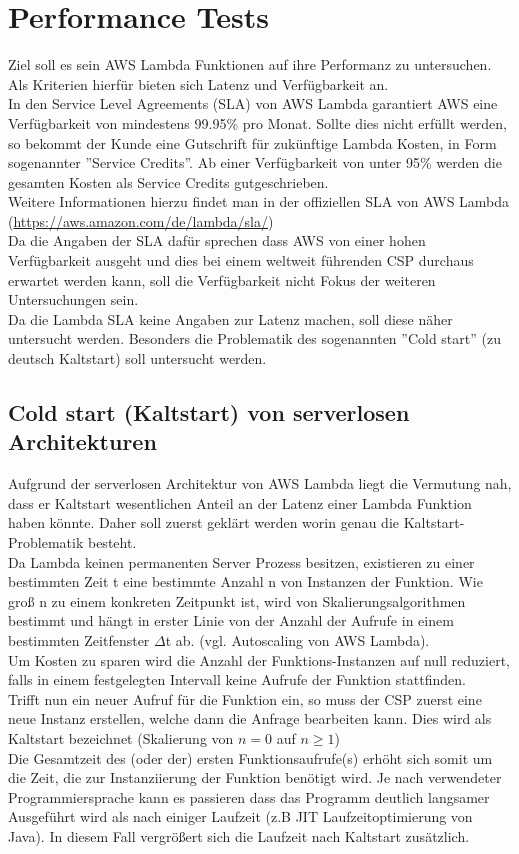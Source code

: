 \documentclass[12pt,a4paper,parskip=half]{scrreprt}
\begin{document}
\chapter{Performance Tests}

Ziel soll es sein AWS Lambda Funktionen auf ihre Performanz zu untersuchen. Als Kriterien hierfür bieten sich Latenz und Verfügbarkeit an.
\\
In den Service Level Agreements (SLA) von AWS Lambda garantiert AWS eine Verfügbarkeit von mindestens 99.95\% pro Monat. Sollte dies nicht erfüllt werden, so bekommt der Kunde eine Gutschrift für zukünftige Lambda Kosten, in Form sogenannter ''Service Credits''. Ab einer Verfügbarkeit von unter 95\% werden die gesamten Kosten als Service Credits gutgeschrieben.
\cite{Lambda-SLA}
\\
Weitere Informationen hierzu findet man in der offiziellen SLA von AWS Lambda (\url{https://aws.amazon.com/de/lambda/sla/})
\\
Da die Angaben der SLA dafür sprechen dass AWS von einer hohen Verfügbarkeit ausgeht und dies bei einem weltweit führenden CSP durchaus erwartet werden kann, soll die Verfügbarkeit nicht Fokus der weiteren Untersuchungen sein.
\\
Da die Lambda SLA keine Angaben zur Latenz machen, soll diese näher untersucht werden. Besonders die Problematik des sogenannten ''Cold start'' (zu deutsch Kaltstart) soll untersucht werden.

\section{Cold start (Kaltstart) von serverlosen Architekturen}
Aufgrund der serverlosen Architektur von AWS Lambda liegt die Vermutung nah, dass er Kaltstart wesentlichen Anteil an der Latenz einer Lambda Funktion haben könnte. Daher soll zuerst geklärt werden worin genau die Kaltstart-Problematik besteht.
\\
Da Lambda keinen permanenten Server Prozess besitzen, existieren zu einer bestimmten Zeit t eine bestimmte Anzahl n von Instanzen der Funktion. Wie groß n zu einem konkreten Zeitpunkt ist, wird von Skalierungsalgorithmen bestimmt und hängt in erster Linie von der Anzahl der Aufrufe in einem bestimmten Zeitfenster $\Delta$t ab. (vgl. Autoscaling von AWS Lambda).
\\
Um Kosten zu sparen wird die Anzahl der Funktions-Instanzen auf null reduziert, falls in einem festgelegten Intervall keine Aufrufe der Funktion stattfinden.
\\
Trifft nun ein neuer Aufruf für die Funktion ein, so muss der CSP zuerst eine neue Instanz erstellen, welche dann die Anfrage bearbeiten kann. Dies wird als Kaltstart bezeichnet (Skalierung von $n=0$ auf $n\geq1$)
\\
Die Gesamtzeit des (oder der) ersten Funktionsaufrufe(s) erhöht sich somit um die Zeit, die zur Instanziierung der Funktion benötigt wird. Je nach verwendeter Programmiersprache kann es passieren dass das Programm deutlich langsamer Ausgeführt wird als nach einiger Laufzeit (z.B JIT Laufzeitoptimierung von Java). In diesem Fall vergrößert sich die Laufzeit nach Kaltstart zusätzlich.
\end{document}
